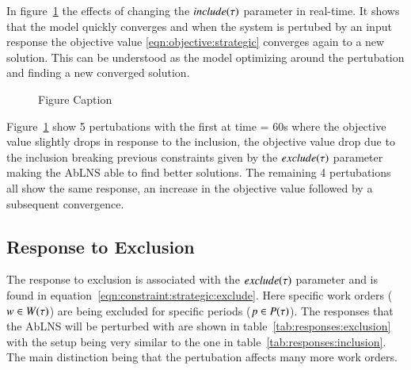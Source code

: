 In figure~\ref{fig:responses:inclusion} the effects of changing the $
include(\tau)$ parameter in real-time. It shows that the model quickly
converges and when the system is pertubed by an input response the objective
value \ref{eqn:objective:strategic} converges again to a new solution. This can
be understood as the model optimizing around the pertubation and finding a new converged solution.

\begin{figure}[H]
	\centering
	\resizebox{\linewidth}{!}{
		
	}
	\caption{Figure Caption}
	\label{fig:responses:inclusion}
\end{figure}
Figure~\ref{fig:responses:inclusion} show 5 pertubations with the first at time = 60s where the objective value 
slightly drops in response to the inclusion, the objective value drop due to the inclusion breaking previous constraints given by the 
$exclude(\tau)$ parameter making the AbLNS able to find better solutions. The remaining 4 pertubations all show the same 
response, an increase in the objective value followed by a subsequent convergence. 

\subsection{Response to Exclusion}
The response to exclusion is associated with the $exclude(\tau)$ parameter and is found in equation~\ref{eqn:constraint:strategic:exclude}.
Here specific work orders ($w \in W(\tau)$) are being excluded for specific periods ($p \in P(\tau)$).
The responses that the AbLNS will be perturbed with are shown in table~\ref{tab:responses:exclusion} with the setup being very similar to the 
one in table~\ref{tab:responses:inclusion}. The main distinction being that the pertubation affects many more work orders.

